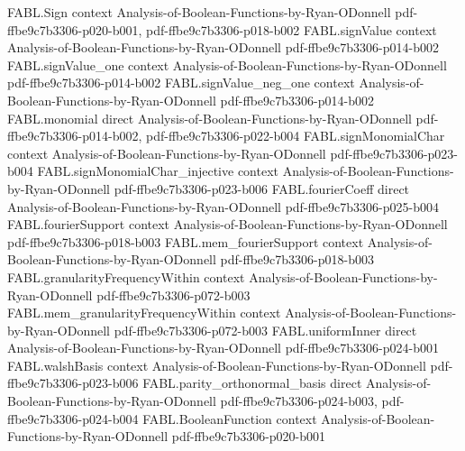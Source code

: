 \begin{theorem}
\label{FABL.fourierWeightAtLevel_eq_choose_mul_of_isSymmetric}
\leanok
{}
\proofstep
  {FABL.Sign}
  {context}
  {Analysis-of-Boolean-Functions-by-Ryan-ODonnell}
  {pdf-ffbe9c7b3306-p020-b001,
    pdf-ffbe9c7b3306-p018-b002}
\proofstep
  {FABL.signValue}
  {context}
  {Analysis-of-Boolean-Functions-by-Ryan-ODonnell}
  {pdf-ffbe9c7b3306-p014-b002}
\proofstep
  {FABL.signValue_one}
  {context}
  {Analysis-of-Boolean-Functions-by-Ryan-ODonnell}
  {pdf-ffbe9c7b3306-p014-b002}
\proofstep
  {FABL.signValue_neg_one}
  {context}
  {Analysis-of-Boolean-Functions-by-Ryan-ODonnell}
  {pdf-ffbe9c7b3306-p014-b002}
\proofstep
  {FABL.monomial}
  {direct}
  {Analysis-of-Boolean-Functions-by-Ryan-ODonnell}
  {pdf-ffbe9c7b3306-p014-b002,
    pdf-ffbe9c7b3306-p022-b004}
\proofstep
  {FABL.signMonomialChar}
  {context}
  {Analysis-of-Boolean-Functions-by-Ryan-ODonnell}
  {pdf-ffbe9c7b3306-p023-b004}
\proofstep
  {FABL.signMonomialChar_injective}
  {context}
  {Analysis-of-Boolean-Functions-by-Ryan-ODonnell}
  {pdf-ffbe9c7b3306-p023-b006}
\proofstep
  {FABL.fourierCoeff}
  {direct}
  {Analysis-of-Boolean-Functions-by-Ryan-ODonnell}
  {pdf-ffbe9c7b3306-p025-b004}
\proofstep
  {FABL.fourierSupport}
  {context}
  {Analysis-of-Boolean-Functions-by-Ryan-ODonnell}
  {pdf-ffbe9c7b3306-p018-b003}
\proofstep
  {FABL.mem_fourierSupport}
  {context}
  {Analysis-of-Boolean-Functions-by-Ryan-ODonnell}
  {pdf-ffbe9c7b3306-p018-b003}
\proofstep
  {FABL.granularityFrequencyWithin}
  {context}
  {Analysis-of-Boolean-Functions-by-Ryan-ODonnell}
  {pdf-ffbe9c7b3306-p072-b003}
\proofstep
  {FABL.mem_granularityFrequencyWithin}
  {context}
  {Analysis-of-Boolean-Functions-by-Ryan-ODonnell}
  {pdf-ffbe9c7b3306-p072-b003}
\proofstep
  {FABL.uniformInner}
  {direct}
  {Analysis-of-Boolean-Functions-by-Ryan-ODonnell}
  {pdf-ffbe9c7b3306-p024-b001}
\proofstep
  {FABL.walshBasis}
  {context}
  {Analysis-of-Boolean-Functions-by-Ryan-ODonnell}
  {pdf-ffbe9c7b3306-p023-b006}
\proofstep
  {FABL.parity_orthonormal_basis}
  {direct}
  {Analysis-of-Boolean-Functions-by-Ryan-ODonnell}
  {pdf-ffbe9c7b3306-p024-b003,
    pdf-ffbe9c7b3306-p024-b004}
\proofstep
  {FABL.BooleanFunction}
  {context}
  {Analysis-of-Boolean-Functions-by-Ryan-ODonnell}
  {pdf-ffbe9c7b3306-p020-b001}

\end{theorem}
